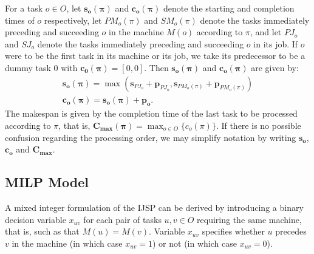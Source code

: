 \documentclass[icae]{iosart2x}
\newcommand{\reviewed}[1]{#1} %
\begin{document}
For a task $o \in O$, let $\mathbf{s_o(\pi)}$ and $\mathbf{c_o(\pi)}$ denote  the starting and completion times of $o$ respectively, let $PM_o(\pi)$ and $SM_o(\pi)$ denote the tasks immediately preceding and succeeding $o$ in the machine \reviewed{$M(o)$} according to $\pi$, and let $PJ_o$ and $SJ_o$ denote the tasks immediately preceding and succeeding $o$ in its job.  If $o$ were to be the first task in its machine or its job, we take its predecessor to be a dummy task 0 with \reviewed{$\mathbf{c_0(\pi)}=[0,0]$}. Then $\mathbf{s_o(\pi)}$ and $\mathbf{c_o(\pi)}$ are given by:
\begin{gather}
\mathbf{s_o(\pi)} = \max(\mathbf{s}_{PJ_o} + \mathbf{p}_{PJ_o},\mathbf{s}_{PM_o(\pi)} + \mathbf{p}_{PM_o(\pi)})\\
\mathbf{c_o(\pi)} = \mathbf{s_o(\pi)} + \mathbf{p_o}.
\end{gather}
The makespan is given by the completion time of the last task to be processed according to $\pi$, that is, $\mathbf{C_{max}(\pi)}=\max_{o\in O}\{c_o(\pi)\}$. If there is no possible confusion regarding the processing order, we may simplify notation by writing $\mathbf{s_o}$, $\mathbf{c_o}$ and $\mathbf{C_{max}}$.


\subsection{\reviewed{MILP Model}}\label{subsecMILP}
\reviewed{A mixed integer formulation of the IJSP can be derived by introducing a binary decision variable $x_{uv}$ for each pair of tasks $u,v \in O$ requiring the same machine, that is, such as that $M(u)=M(v) $. Variable $x_{uv}$ specifies whether $u$ precedes $v$ in the machine (in which case $x_{uv}=1$) or not (in which case $x_{uv}=0$).}
\end{document}
